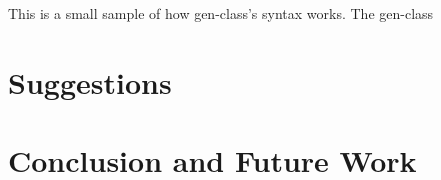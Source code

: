 \documentclass[12pt]{article}
\begin{document}
	This is a small sample of how gen-class's syntax works. The gen-class
\section{Suggestions}\label{sec:sugg}

\section{Conclusion and Future Work}\label{sec:con}




%
%

%  
%
%




\end{document}

